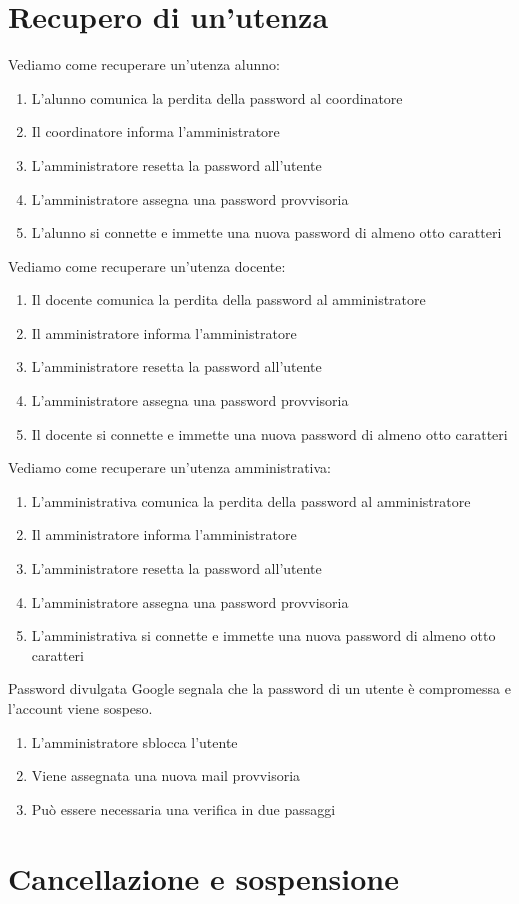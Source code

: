 \section{Recupero di un'utenza}
Vediamo come recuperare un'utenza alunno:
\begin{enumerate}
	\item L'alunno comunica la perdita della password al coordinatore
	\item Il coordinatore informa l'amministratore
	\item L'amministratore resetta la password all'utente
	\item L'amministratore assegna una password provvisoria 
	\item L'alunno si connette e immette una nuova password di almeno otto 
	caratteri 
\end{enumerate}
Vediamo come recuperare un'utenza docente:
\begin{enumerate}
	\item Il docente comunica la perdita della password al amministratore
	\item Il amministratore informa l'amministratore
	\item L'amministratore resetta la password all'utente
	\item L'amministratore assegna una password provvisoria 
	\item Il docente si connette e immette una nuova password di almeno otto 
	caratteri 
\end{enumerate}
Vediamo come recuperare un'utenza amministrativa:
\begin{enumerate}
	\item L'amministrativa comunica la perdita della password al amministratore
	\item Il amministratore informa l'amministratore
	\item L'amministratore resetta la password all'utente
	\item L'amministratore assegna una password provvisoria 
	\item L'amministrativa si connette e immette una nuova password di almeno 
	otto caratteri 
\end{enumerate}
Password divulgata Google segnala che la password di un utente è compromessa e 
l'account viene sospeso.
\begin{enumerate}
	\item L'amministratore sblocca l'utente
	\item Viene assegnata una nuova mail provvisoria 
	\item Può essere necessaria una verifica in due passaggi
\end{enumerate}
\section{Cancellazione e sospensione}